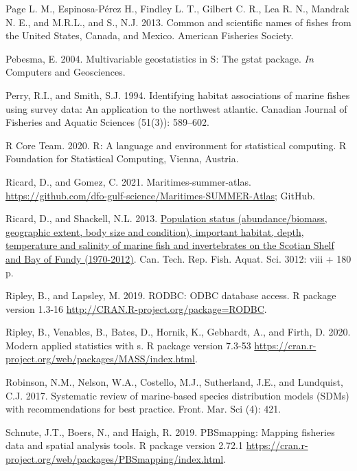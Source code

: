 \documentclass[12pt]{article}\usepackage[]{graphicx}\usepackage[]{color}
\begin{document}
\leavevmode\hypertarget{ref-page:etal:7thedition}{}%
Page L. M., Espinosa-Pérez H., Findley L. T., Gilbert C. R., Lea R. N., Mandrak N. E., and M.R.L., and S., N.J. 2013. Common and scientific names of fishes from the United States, Canada, and Mexico. American Fisheries Society.

\leavevmode\hypertarget{ref-R:package:gstat}{}%
Pebesma, E. 2004. Multivariable geostatistics in S: The gstat package. \emph{In} Computers and Geosciences.

\leavevmode\hypertarget{ref-Perry:Smith:1994:cjfas}{}%
Perry, R.I., and Smith, S.J. 1994. Identifying habitat associations of marine fishes using survey data: An application to the northwest atlantic. Canadian Journal of Fisheries and Aquatic Sciences (51(3)): 589--602.

\leavevmode\hypertarget{ref-R:2020}{}%
R Core Team. 2020. R: A language and environment for statistical computing. R Foundation for Statistical Computing, Vienna, Austria.

\leavevmode\hypertarget{ref-Ricard-Gomez-2021}{}%
Ricard, D., and Gomez, C. 2021. Maritimes-summer-atlas. \url{https://github.com/dfo-gulf-science/Maritimes-SUMMER-Atlas}; GitHub.

\leavevmode\hypertarget{ref-Ricard:MARatlas:2013}{}%
Ricard, D., and Shackell, N.L. 2013. \href{http://publications.gc.ca/site/eng/9.589947/publication.html}{Population status (abundance/biomass, geographic extent, body size and condition), important habitat, depth, temperature and salinity of marine fish and invertebrates on the Scotian Shelf and Bay of Fundy (1970-2012)}. Can. Tech. Rep. Fish. Aquat. Sci. 3012: viii + 180 p.

\leavevmode\hypertarget{ref-R:package:RODBC}{}%
Ripley, B., and Lapsley, M. 2019. RODBC: ODBC database access. R package version 1.3-16 \url{http://CRAN.R-project.org/package=RODBC}.

\leavevmode\hypertarget{ref-R:package:MASS}{}%
Ripley, B., Venables, B., Bates, D., Hornik, K., Gebhardt, A., and Firth, D. 2020. Modern applied statistics with s. R package version 7.3-53 \url{https://cran.r-project.org/web/packages/MASS/index.html}.

\leavevmode\hypertarget{ref-Robinson:2017}{}%
Robinson, N.M., Nelson, W.A., Costello, M.J., Sutherland, J.E., and Lundquist, C.J. 2017. Systematic review of marine-based species distribution models (SDMs) with recommendations for best practice. Front. Mar. Sci (4): 421.

\leavevmode\hypertarget{ref-R:package:PBSmapping}{}%
Schnute, J.T., Boers, N., and Haigh, R. 2019. PBSmapping: Mapping fisheries data and spatial analysis tools. R package version 2.72.1 \url{https://cran.r-project.org/web/packages/PBSmapping/index.html}.
\end{document}
